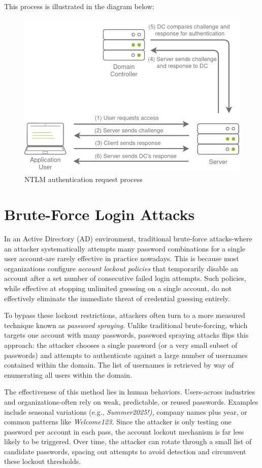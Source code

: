 This process is illustrated in the diagram below:
\begin{figure}
    \centering
    \includegraphics[width=0.75\linewidth]{1ntlmauth.png}
    \caption{NTLM authentication request process}
    \label{fig:placeholder}
\end{figure}
\section{Brute-Force Login Attacks}
In an Active Directory (AD) environment, traditional brute-force attacks-where an attacker systematically attempts many password combinations for a single user account-are rarely effective in practice nowadays. This is because most organizations configure \textit{account lockout policies} that temporarily disable an account after a set number of consecutive failed login attempts. Such policies, while effective at stopping unlimited guessing on a single account, do not effectively eliminate the immediate threat of credential guessing entirely.

To bypass these lockout restrictions, attackers often turn to a more measured technique known as \textit{password spraying.} Unlike traditional brute-forcing, which targets one account with many passwords, password spraying attacks flips this approach: the attacker chooses a single password (or a very small subset of passwords) and attempts to authenticate against a large number of usernames contained within the domain. The list of usernames is retrieved by way of enumerating all users within the domain.

The effectiveness of this method lies in human behaviors. Users-across industries and organizations-often rely on weak, predictable, or reused passwords. Examples include seasonal variations (e.g., \textit{Summer2025!),} company names plus year, or common patterns like \textit{Welcome123.} Since the attacker is only testing one password per account in each pass, the account lockout mechanism is far less likely to be triggered. Over time, the attacker can rotate through a small list of candidate passwords, spacing out attempts to avoid detection and circumvent these lockout thresholds.

